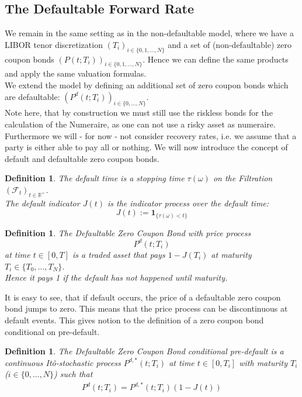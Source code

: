 \documentclass[12pt]{article}
\newtheorem{definition}[theorem]{Definition}
\begin{document}
	\subsection{The Defaultable Forward Rate}
		We remain in the same setting as in the non-defaultable model, where we have a LIBOR tenor discretization \((T_i)_{i\in\{0, 1, ..., N\}}\) and a set of (non-defaultable) zero coupon bonds \((P(t;T_i))_{i\in\{0, 1, ..., N\}}\). Hence we can define the same products and apply the same valuation formulas.\\
		We extend the model by defining an additional set of zero coupon bonds which are defaultable: \((P^d(t;T_i))_{i\in\{0, ..., N\}}\).\\
		Note here, that by construction we must still use the riskless bonds for the calculation of the Numeraire, as one can not use a risky asset as numeraire.
		Furthermore we will \color{red}- for now - \color{black} not consider recovery rates, i.e. we assume that a party is either able to pay all or nothing.
		We will now introduce the concept of default and defaultable zero coupon bonds.
	\begin{definition}
		The \emph{default time} is a stopping time \(\tau(\omega)\) on the Filtration \((\mathcal{F}_t)_{t\in \mathbb{R}^+}\).\\
		The \emph{default indicator} \(J(t)\) is the indicator process over the default time:
		\[J(t) := \mathbf{1}_{\{\tau(\omega) < t\}}\]
	\end{definition}
	\begin{definition}
		The \emph{Defaultable Zero Coupon Bond} with price process \[P^d(t; T_i)\] at time \(t \in \left[0, T\right]\) is a traded asset that pays \(1 - J(T_i)\) at maturity  \(T_i \in \{T_0, ..., T_N\}\).\\
		Hence it pays 1 if the default has not happened until maturity. 
	\end{definition}
	It is easy to see, that if default occurs, the price of a defaultable zero coupon bond jumps to zero. This means that the price process can be discontinuous at default events. This gives notion to the definition of a zero coupon bond conditional on pre-default.
	\begin{definition}
		The \emph{Defaultable Zero Coupon Bond conditional pre-default} is a continuous Itô-stochastic process \(P^{d,*}(t; T_i)\) at time \(t \in \left[0, T_i\right]\) with maturity $T_i$ ($i \in \{0, ..., N\}$) such that
		\begin{align*}
			P^{d}(t; T_i) = P^{d,*}(t; T_i)(1 - J(t))
		\end{align*}
	\end{definition}
\end{document}
